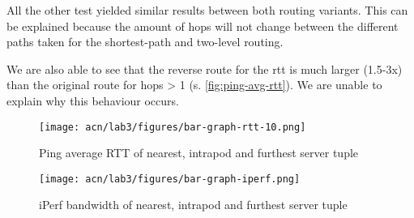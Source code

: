 \documentclass[a4paper,11pt]{article}
\begin{document}
All the other test yielded similar results between both routing variants.
This can be explained because the amount of hops will not change between the different paths taken for the shortest-path and two-level routing.

We are also able to see that the reverse route for the rtt is much larger (1.5-3x) than the original route for hops > 1 (s. \autoref{fig:ping-avg-rtt}).
We are unable to explain why this behaviour occurs.

\begin{figure}[h]
    \centering
    \texttt{[image: acn/lab3/figures/bar-graph-rtt-10.png]}
    \caption{Ping average RTT of nearest, intrapod and furthest server tuple}
    \label{fig:ping-avg-rtt}
\end{figure}

\begin{figure}[h]
    \centering
    \texttt{[image: acn/lab3/figures/bar-graph-iperf.png]}
    \caption{iPerf bandwidth of nearest, intrapod and furthest server tuple}
    \label{fig:iperf-bw}
\end{figure}

\begin{comment}
Shortest path routing:
Discovering topology took:      10.447324752807617
Average of 10 pingAll took:     4.478760123252869
----------------------------------------
Results nearest:
ping avg rtt h10002 -> h10003: 8.1676ms
ping avg rtt h10003 -> h10002: 10.3411ms
iperf h10002 6.69 Mbits/sec <-> h10003 7.71 Mbits/sec
Results intrapod:
ping avg rtt h10002 -> h10012: 12.2364ms
ping avg rtt h10012 -> h10002: 29.0252ms
iperf h10002 2.16 Mbits/sec <-> h10012 2.65 Mbits/sec
Results furthest:
ping avg rtt h10002 -> h10313: 17.9409ms
ping avg rtt h10313 -> h10002: 30.8315ms
iperf h10002 1.29 Mbits/sec <-> h10313 1.98 Mbits/sec



Two-Level routing:
Discovering topology took:      5.356467962265015
Average of 10 pingAll took:     4.152475214004516
----------------------------------------
Results nearest:
ping avg rtt h10002 -> h10003: 8.8902ms
ping avg rtt h10003 -> h10002: 8.5235ms
iperf h10002 7.51 Mbits/sec <-> h10003 8.76 Mbits/sec
Results intrapod:
ping avg rtt h10002 -> h10012: 12.6144ms
ping avg rtt h10012 -> h10002: 31.0049ms
iperf h10002 2.65 Mbits/sec <-> h10012 3.25 Mbits/sec
Results furthest:
ping avg rtt h10002 -> h10313: 18.7177ms
ping avg rtt h10313 -> h10002: 38.9701ms
iperf h10002 1.51 Mbits/sec <-> h10313 1.95 Mbits/sec
\end{comment}
\end{document}
